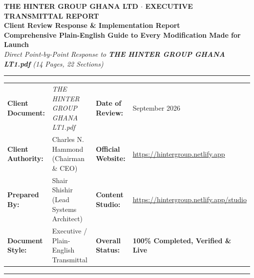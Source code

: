 \documentclass[11pt,a4paper]{article}
\begin{document}
\begin{center}
    {\fontsize{10}{12}\selectfont\color{HGGAccentBlue}\textbf{THE HINTER GROUP GHANA LTD $\cdot$ EXECUTIVE TRANSMITTAL REPORT}} \\[0.2cm]
    {\fontsize{21}{25}\selectfont\color{HGGNavy}\textbf{Client Review Response \& Implementation Report}}\\[0.15cm]
    {\fontsize{11}{14}\selectfont\color{HGGGold}\textbf{Comprehensive Plain-English Guide to Every Modification Made for Launch}} \\[0.1cm]
    {\fontsize{9.5}{12}\selectfont\color{HGGMutedText}\textit{Direct Point-by-Point Response to \textbf{THE HINTER GROUP GHANA LT1.pdf} (14 Pages, 22 Sections)}}
\end{center}

\vspace{0.15cm}
\noindent\textcolor{HGGRuleGold}{\rule{\textwidth}{1.2pt}}

\begin{center}
\small
\begin{tabularx}{\textwidth}{lXlX}
    \textbf{Client Document:} & \textit{THE HINTER GROUP GHANA LT1.pdf} & \textbf{Date of Review:} & September 2026 \\
    \textbf{Client Authority:} & Charles N. Hammond (Chairman \& CEO) & \textbf{Official Website:} & \url{https://hintergroup.netlify.app} \\
    \textbf{Prepared By:} & Shair Shishir (Lead Systems Architect) & \textbf{Content Studio:} & \url{https://hintergroup.netlify.app/studio} \\
    \textbf{Document Style:} & Executive / Plain-English Transmittal & \textbf{Overall Status:} & \textbf{\color{HGGGreen}100\% Completed, Verified \& Live} \\
\end{tabularx}
\end{center}
\noindent\textcolor{HGGBorder}{\rule{\textwidth}{0.8pt}}

\vspace{0.2cm}
\end{document}
